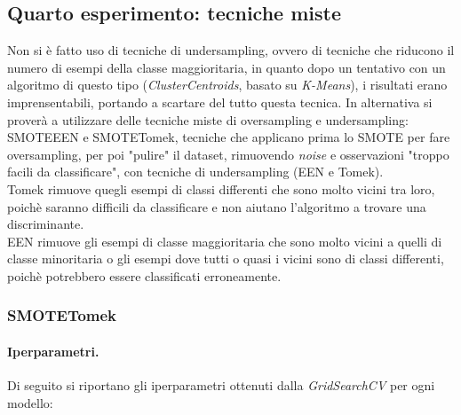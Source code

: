 \subsection{Quarto esperimento: tecniche miste}
\noindent Non si è fatto uso di tecniche di undersampling, ovvero di tecniche che riducono il numero di esempi della classe maggioritaria, in quanto dopo un tentativo con un algoritmo di questo tipo (\textit{ClusterCentroids}, basato su \textit{K-Means}), i risultati erano imprensentabili, portando a scartare del tutto questa tecnica. In alternativa si proverà a utilizzare delle tecniche miste di oversampling e undersampling: SMOTEEEN e SMOTETomek, tecniche che applicano prima lo SMOTE per fare oversampling, per poi "pulire" il dataset, rimuovendo \textit{noise} e osservazioni "troppo facili da classificare", con tecniche di undersampling (EEN e Tomek).\\ Tomek rimuove quegli esempi di classi differenti che sono molto vicini tra loro, poichè saranno difficili da classificare e non aiutano l'algoritmo a trovare una discriminante. \\ EEN rimuove gli esempi di classe maggioritaria che sono molto vicini a quelli di classe minoritaria o gli esempi dove tutti o quasi i vicini sono di classi differenti, poichè potrebbero essere classificati erroneamente.

\subsubsection{SMOTETomek}
\paragraph{Iperparametri.} Di seguito si riportano gli iperparametri ottenuti dalla \textit{GridSearchCV} per ogni modello:

